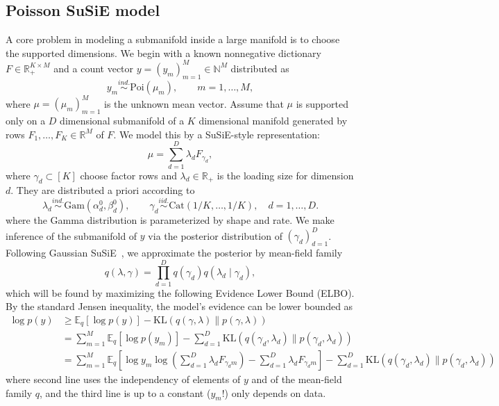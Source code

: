 \documentclass[11pt]{article}
\newcommand{\N}{\mathbb{N}}
\newcommand{\R}{\mathbb{R}}
\newcommand{\Poi}{\mathrm{Poi}}
\newcommand{\Gam}{\mathrm{Gam}}
\newcommand{\Cat}{\mathrm{Cat}}
\theoremstyle{plain}
\theoremstyle{definition}
\begin{document}
\subsection{Poisson SuSiE model}
A core problem in modeling a submanifold inside a large manifold is to choose the supported dimensions.
We begin with a known nonnegative dictionary
$F \in \R_+^{K \times M}$ and a count vector $y = (y_m)_{m=1}^{M}\in \N^M$ distributed as
\begin{equation}
y_m \overset{ind.}{\sim} \Poi(\mu_m), \qquad m=1,\ldots,M,
\label{eq:pois-susie-model}
\end{equation}
where $\mu = (\mu_m)_{m=1}^{M}$ is the unknown mean vector. Assume that $\mu$ is supported only on a $D$ dimensional submanifold of a $K$ dimensional manifold generated by rows $F_1, \dots, F_K \in \R^{M}$ of $F$. We model this by a SuSiE-style representation:
\begin{equation}
\mu = \sum_{d = 1}^{D} \lambda_d F_{\gamma_d},
\end{equation}
where $\gamma_d\subset [K]$ choose factor rows and $\lambda_d\in \R_+$ is the loading size for dimension $d$. They are distributed a priori according to
\begin{equation}
  \lambda_d \overset{ind.}{\sim} \Gam(\alpha_d^0,\beta_d^0),
  \qquad
  \gamma_d \overset{iid.}{\sim} \Cat(1/K,\ldots,1/K), \quad d = 1, \dots, D.
\end{equation}
where the Gamma distribution is parameterized by shape and rate. We make inference of the submanifold of $y$ via the posterior distribution of $(\gamma_d)_{d=1}^{D}$. Following Gaussian SuSiE~\cite{Wang2020-cr}, we approximate the posterior by mean-field family
\begin{equation}
  q(\lambda,\gamma) = \prod_{d=1}^D q(\gamma_d)q(\lambda_d \mid \gamma_d),
\end{equation}
which will be found by maximizing the following Evidence Lower Bound (ELBO). By the standard Jensen inequality, the model's evidence can be lower bounded as \begin{align*}
\log p(y) & \geq \mathbb E_{q} [\log p(y)] - \mathrm{KL}(q(\gamma, \lambda) \| p(\gamma, \lambda))\\
& = \sum_{m=1}^{M}\mathbb E_{q} [\log p(y_m)] - \sum_{d=1}^{D} \mathrm{KL}(q(\gamma_d, \lambda_d) \| p(\gamma_d, \lambda_d)) \\
& = \sum_{m = 1}^{M}\mathbb E_{q} \left[\log y_m \log\left(\sum_{d=1}^D \lambda_d F_{\gamma_d m}\right) - \sum_{d=1}^D \lambda_d F_{\gamma_d m} \right] - \sum_{d=1}^{D} \mathrm{KL}(q(\gamma_d, \lambda_d) \| p(\gamma_d, \lambda_d))
\end{align*}
where second line uses the independency of elements of $y$ and of the mean-field family $q$, and the third line is up to a constant ($y_m!$) only depends on data.
\end{document}
